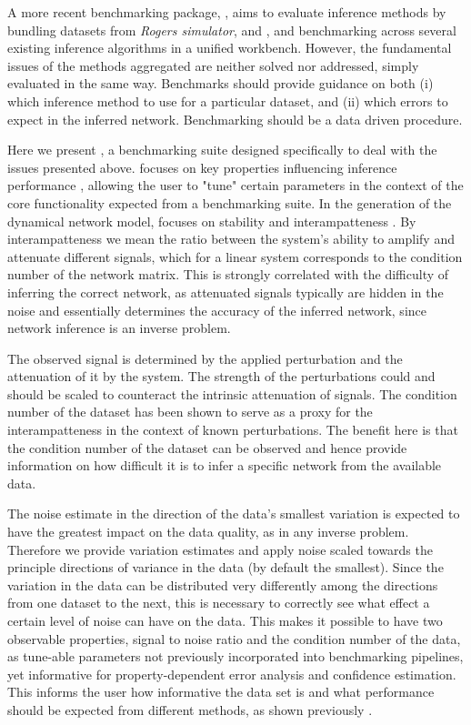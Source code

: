 A more recent benchmarking package, \netbenchmark \citep{Bellot2015}, aims to evaluate inference methods by bundling datasets from \emph{Rogers simulator}\cite{rogers2005bayesian}, \emph{\syntren}  and \emph{\gnw}, and benchmarking across several existing inference algorithms in a unified workbench. However, the fundamental issues of the methods aggregated are neither solved nor addressed, simply evaluated in the same way.%
Benchmarks should provide guidance on both (i) which inference method to use for a particular dataset, and (ii) which errors to expect in the inferred network. Benchmarking should be a data driven procedure.

Here we present \gs, a benchmarking suite designed specifically to deal with the issues presented above.
\gs focuses on key properties influencing inference performance \cite{Tjarnberg2014}, allowing the user to "tune" certain parameters in the context of the core functionality expected from a benchmarking suite. 
In the generation of the dynamical network model, \gs focuses on stability\cite{Zavlanos2011} and interampatteness \cite{Nordling2009}.
By interampatteness we mean the ratio between the system's ability to amplify and attenuate different signals, which for a linear system corresponds to the condition number of the network matrix. This is strongly correlated with the difficulty of inferring the correct network, as attenuated signals typically are hidden in the noise and essentially determines the accuracy of the inferred network, since network inference is an inverse problem\cite{Nordling2013phdthesis}.

The observed signal is determined by the applied perturbation and the attenuation of it by the system. The strength of the perturbations could and should be scaled to counteract the intrinsic attenuation of signals.
The condition number of the dataset has been shown to serve as a proxy for the interampatteness in the context of known perturbations\cite{Nordling2013phdthesis,Tjarnberg2014}. 
The benefit here is that the condition number of the dataset can be observed and hence provide information on how difficult it is to infer a specific network from the available data.

The noise estimate in the direction of the data's smallest variation is expected to have the greatest impact on the data quality, as in any inverse problem.
Therefore we provide variation estimates and apply noise scaled towards the principle directions of variance in the data (by default the smallest).
Since the variation in the data can be distributed very differently among the directions from one dataset to the next, this is necessary to correctly see what effect a certain level of noise can have on the data.
This makes it possible to have two observable properties, signal to noise ratio and the condition number of the data, as tune-able parameters not previously incorporated into benchmarking pipelines, yet informative for property-dependent error analysis and confidence estimation. 
This informs the user how informative the data set is and what performance should be expected from different methods, as shown previously \cite{Tjarnberg2013,Tjarnberg2014}.

